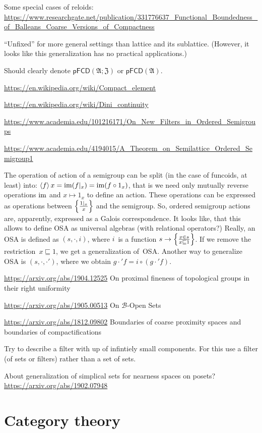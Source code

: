 \documentclass{amsart}
\begin{document}
Some special cases of reloids:
\url{https://www.researchgate.net/publication/331776637_Functional_Boundedness_of_Balleans_Coarse_Versions_of_Compactness}

``Unfixed'' for more general settings than lattice and its
sublattice. (However, it looks like this generalization has
no practical applications.)

Should clearly denote $\mathsf{pFCD}(\mathfrak{A};\mathfrak{Z})$ or $\mathsf{pFCD}(\mathfrak{A})$.

\url{https://en.wikipedia.org/wiki/Compact_element}

\url{https://en.wikipedia.org/wiki/Dini_continuity}

\url{https://www.academia.edu/101216171/On_New_Filters_in_Ordered_Semigroups}

\url{https://www.academia.edu/4194015/A_Theorem_on_Semilattice_Ordered_Semigroup1}

The operation of action of a semigroup can be split (in the case of funcoids, at least) into:
$\left\langle f\right\rangle x = \operatorname{im}(f|_x)= \operatorname{im}(f\circ 1_x)$, that is we need only mutually reverse operations
$\operatorname{im}$ and $x\mapsto 1_x$ to define an action.
These operations can be expressed as operations between $\left\{ \frac{1|_x}{x}\right\}$ and the semigroup.
So, ordered semigroup actions are, apparently, expressed as a Galois correspondence.
It looks like, that this allows to define OSA as universal algebras (with relational operators?)
Really, an OSA is defined as $(s,\cdot,i)$, where $i$~is a function $s\to\left\{ \frac{x\in s}{x\sqsubseteq 1}\right\}$.
If we remove the restriction~$x\sqsubseteq 1$, we get a generalization of~OSA.
Another way to generalize OSA is $(s,\cdot,\cdot')$, where we obtain $g\cdot'f=i\circ(g\cdot'f)$.

\url{https://arxiv.org/abs/1904.12525} On proximal fineness of topological groups in their right uniformity

\url{https://arxiv.org/abs/1905.00513}
On $\mathcal{B}$-Open Sets

\url{https://arxiv.org/abs/1812.09802} Boundaries of coarse proximity spaces and boundaries of compactifications

Try to describe a filter with up of infintiely small
components.
For this use a filter (of sets or filters) rather than a set
of sets.

About generalization of simplical sets for nearness spaces on posets?
\url{https://arxiv.org/abs/1902.07948}

\section{Category theory}
\end{document}
